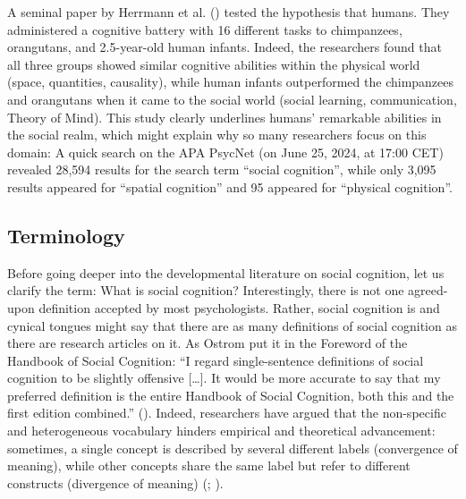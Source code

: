 \documentclass[
]{scrbook}
\begin{document}
A seminal paper by Herrmann et al. () tested the hypothesis that humans. They administered a cognitive battery with 16 different tasks to chimpanzees, orangutans, and 2.5-year-old human infants. Indeed, the researchers found that all three groups showed similar cognitive abilities within the physical world (space, quantities, causality), while human infants outperformed the chimpanzees and orangutans when it came to the social world (social learning, communication, Theory of Mind). This study clearly underlines humans' remarkable abilities in the social realm, which might explain why so many researchers focus on this domain: A quick search on the APA PsycNet (on June 25, 2024, at 17:00 CET) revealed 28,594 results for the search term ``social cognition'', while only 3,095 results appeared for ``spatial cognition'' and 95 appeared for ``physical cognition''.

\subsection{Terminology}\label{terminology}

Before going deeper into the developmental literature on social cognition, let us clarify the term: What is social cognition? Interestingly, there is not one agreed-upon definition accepted by most psychologists. Rather, social cognition is and cynical tongues might say that there are as many definitions of social cognition as there are research articles on it. As Ostrom put it in the Foreword of the Handbook of Social Cognition: ``I regard single-sentence definitions of social cognition to be slightly offensive {[}\ldots{]}. It would be more accurate to say that my preferred definition is the entire Handbook of Social Cognition, both this and the first edition combined.'' (). Indeed, researchers have argued that the non-specific and heterogeneous vocabulary hinders empirical and theoretical advancement: sometimes, a single concept is described by several different labels (convergence of meaning), while other concepts share the same label but refer to different constructs (divergence of meaning) (; ).
\end{document}
